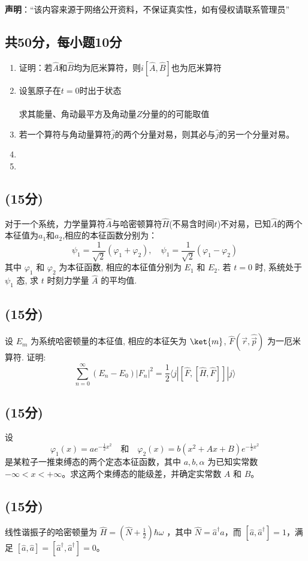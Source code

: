 
\textbf{声明}：“该内容来源于网络公开资料，不保证真实性，如有侵权请联系管理员”

\subsection{共50分，每小题10分}
\begin{enumerate}
\item 证明：若$\hat{A}$和$\hat{B}$均为厄米算符，则$i[\hat{A},\hat{B}]$也为厄米算符
\item 设氢原子在$t=0$时出于状态\\\\
求其能量、角动最平方及角动量$Z$分量的的可能取值
\item 若一个算符与角动量算符$\hat{j}$的两个分量对易，则其必与$\hat{j}$的另一个分量对易。
\item 
\item 
\end{enumerate}
\subsection{(15分)}
对于一个系统，力学量算符$\hat{A}$与哈密顿算符$\hat{H}$(不易含时间$t$)不对易，已知$\hat{A}$的两个本征值为$a_1$和$a_2$,相应的本征函数分别为：
$$\psi_1 = \frac{1}{\sqrt{2}} (\varphi_1 + \varphi_2), \quad \psi_1 = \frac{1}{\sqrt{2}} (\varphi_1 - \varphi_2)~$$
其中 $\varphi_1$ 和 $\varphi_2$ 为本征函数, 相应的本征值分别为 $E_1$ 和 $E_2$. 若 $t = 0$ 时, 系统处于 $\psi_1$ 态, 求 $t$ 时刻力学量 $\hat{A}$ 的平均值.
\subsection{(15分)}
设 $E_m$ 为系统哈密顿量的本征值, 相应的本征矢为 $\ket{m}$, $\hat{F}(\vec{r}, \hat{\vec{p}})$ 为一厄米算符. 证明:
\[
\sum^\infty_{n=0}(E_n - E_0) |F_n|^2 =\frac{1}{2}\langle j |[\hat{F}, [\hat{H}, \hat{F}]] |j \rangle ~
\]
\subsection{(15分)}

设
\[
\varphi_1(x) = ae^{-\frac{1}{2}x^2} \quad \text{和} \quad \varphi_2(x) = b(x^2 + Ax + B)e^{-\frac{1}{2}x^2}~
\]
是某粒子一推束缚态的两个定态本征函数，其中 $a, b, \alpha$ 为已知实常数$-\infty < x < +\infty$。求这两个束缚态的能级差，并确定实常数 $A$ 和 $B$。
\subsection{(15分)}
线性谐振子的哈密顿量为 $\hat{H} = (\hat{N} + \frac{1}{2})\hbar\omega$ ，其中 $\hat{N} = \hat{a}^\dagger \hat{a}$，而 $[\hat{a}, \hat{a}^\dagger] = 1$，满足 $[\hat{a}, \hat{a}] = [\hat{a}^\dagger, \hat{a}^\dagger] = 0$。


